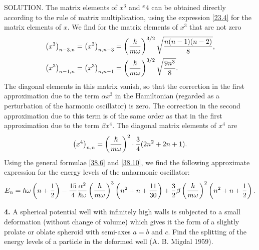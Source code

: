 {SOLUTION. The matrix elements of $ x^3 $ and $ ^x4 $ can be obtained directly according to the rule of matrix multiplication, using the expression \eqref{23.4} for the matrix elements of $ x $. We find for the matrix elements of $ x^3 $ that are not zero
\begin{equation*}
\begin{split}
\left(x^3\right)_{n-3,n}&=\left(x^3\right)_{n,n-3}=\left(\frac{\hbar}{m\omega}\right)^{3/2}\sqrt{\frac{n(n-1)(n-2)}{8}},\\
\left(x^3\right)_{n-1,n}&=\left(x^3 \right)_{n,n-1}=\left(\frac{\hbar}{m\omega}\right)^{3/2}\sqrt{\frac{9n^3}{8}}.
\end{split}
\end{equation*}
The diagonal elements in this matrix vanish, so that the correction in the first approximation due to the term $ \alpha x^3 $ in the Hamiltonian (regarded as a perturbation of the harmonic oscillator) is zero. The correction in the second approximation due to this term is of the same order as that in the first approximation due to the term $ \beta x^4 $. The diagonal matrix elements of $ x^4 $ are
\[ \left(x^4 \right)_{n,n}=\left(\frac{\hbar}{m\omega} \right)^2\cdot\frac{3}{4}(2n^2+2n+1). \]
Using the general formulae \eqref{38.6} and \eqref{38.10}, we find the following approximate expression for the energy levels of the anharmonic oscillator:
\[ E_n=\hbar\omega\left(n+\frac{1}{2} \right)-\frac{15}{4}\frac{\alpha^2}{\hbar\omega}\left(\frac{\hbar}{m\omega} \right)^3\left(n^2+n+\frac{11}{30} \right)+\frac{3}{2}\beta\left(\frac{\hbar}{m\omega} \right)^2\left(n^2+n+\frac{1}{2} \right). \]




\textbf{4.} A spherical potential well with infinitely high walls is subjected to a small deformation (without change of volume) which gives it the form of a slightly prolate or oblate spheroid with semi-axes $ a = b $ and $ c $. Find the splitting of the energy levels of a particle in the deformed well (A. B. Migdal 1959).





}
